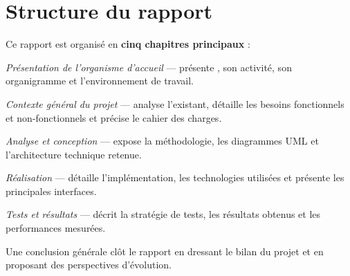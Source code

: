 \section{Structure du rapport}
\label{sec:intro:structure}

Ce rapport est organisé en \textbf{cinq chapitres principaux} :

\begin{description}[leftmargin=!, labelwidth=\widthof{\textbf{Chapitre 5}}]
  \item[\textbf{Chapitre 1}] \textit{Présentation de l'organisme d'accueil} —
    présente \CompanyName, son activité, son organigramme et
    l'environnement de travail.

  \item[\textbf{Chapitre 2}] \textit{Contexte général du projet} —
    analyse l'existant, détaille les besoins fonctionnels et
    non-fonctionnels et précise le cahier des charges.

  \item[\textbf{Chapitre 3}] \textit{Analyse et conception} —
    expose la méthodologie, les diagrammes UML et l'architecture
    technique retenue.

  \item[\textbf{Chapitre 4}] \textit{Réalisation} —
    détaille l'implémentation, les technologies utilisées et
    présente les principales interfaces.

  \item[\textbf{Chapitre 5}] \textit{Tests et résultats} —
    décrit la stratégie de tests, les résultats obtenus et
    les performances mesurées.
\end{description}

Une conclusion générale clôt le rapport en dressant le bilan
du projet et en proposant des perspectives d'évolution.

\clearpage
